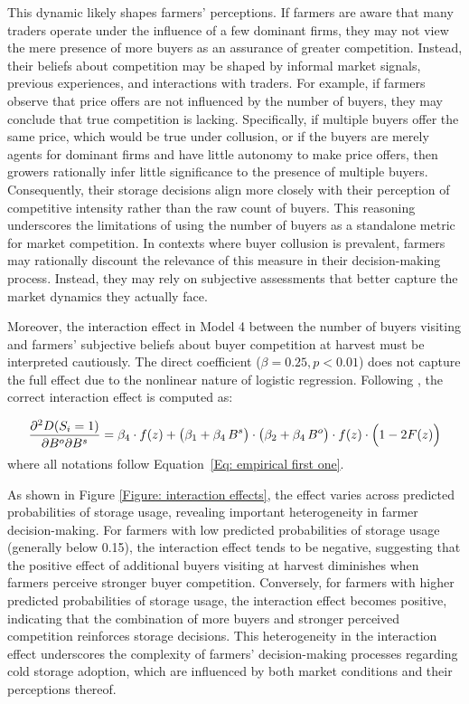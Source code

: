 This dynamic likely shapes farmers' perceptions. If farmers are aware that many traders operate under the influence of a few dominant firms, they may not view the mere presence of more buyers as an assurance of greater competition. Instead, their beliefs about competition may be shaped by informal market signals, previous experiences, and interactions with traders. For example, if farmers observe that price offers are not influenced by the number of buyers, they may conclude that true competition is lacking. Specifically, if multiple buyers offer the same price, which would be true under collusion, or if the buyers are merely agents for dominant firms and have little autonomy to make price offers, then growers rationally infer little significance to the presence of multiple buyers. Consequently, their storage decisions align more closely with their perception of competitive intensity rather than the raw count of buyers. This reasoning underscores the limitations of using the number of buyers as a standalone metric for market competition. In contexts where buyer collusion is prevalent, farmers may rationally discount the relevance of this measure in their decision-making process. Instead, they may rely on subjective assessments that better capture the market dynamics they actually face.  

Moreover, the interaction effect in Model 4 between the number of buyers visiting and farmers' subjective beliefs about buyer competition at harvest must be interpreted cautiously. The direct coefficient ($\beta = 0.25, p<0.01$) does not capture the full effect due to the nonlinear nature of logistic regression. Following \cite{ai2003interaction}, the correct interaction effect is computed as:

\begin{equation}
\frac{\partial^2 D(S_i=1)}{\partial B^o \partial B^s} = \beta_{4} \cdot f(z) + \bigl(\beta_1 + \beta_{4} \, B^s\bigr) \cdot \bigl(\beta_2 + \beta_{4} \, B^o\bigr) \cdot f(z) \cdot \Bigl(1 - 2F(z)\Bigr)
\end{equation}
\noindent where all notations follow Equation~\ref{Eq: empirical first one}.

As shown in Figure \ref{Figure: interaction effects}, the effect varies across predicted probabilities of storage usage, revealing important heterogeneity in farmer decision-making. For farmers with low predicted probabilities of storage usage (generally below 0.15), the interaction effect tends to be negative, suggesting that the positive effect of additional buyers visiting at harvest diminishes when farmers perceive stronger buyer competition. Conversely, for farmers with higher predicted probabilities of storage usage, the interaction effect becomes positive, indicating that the combination of more buyers and stronger perceived competition reinforces storage decisions. This heterogeneity in the interaction effect underscores the complexity of farmers' decision-making processes regarding cold storage adoption, which are influenced by both market conditions and their perceptions thereof.

